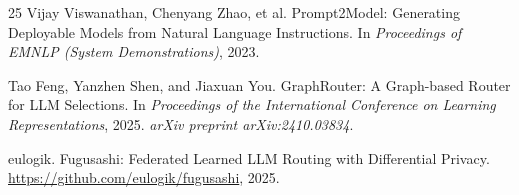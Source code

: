 \documentclass[11pt,a4paper]{article}
\begin{document}
\begin{thebibliography}{25}
Vijay Viswanathan, Chenyang Zhao, et al.
\newblock Prompt2Model: Generating Deployable Models from Natural Language Instructions.
\newblock In \emph{Proceedings of EMNLP (System Demonstrations)}, 2023.

Tao Feng, Yanzhen Shen, and Jiaxuan You.
\newblock GraphRouter: A Graph-based Router for LLM Selections.
\newblock In \emph{Proceedings of the International Conference on Learning Representations}, 2025.
\newblock \emph{arXiv preprint arXiv:2410.03834}.

eulogik.
\newblock Fugusashi: Federated Learned LLM Routing with Differential Privacy.
\newblock \url{https://github.com/eulogik/fugusashi}, 2025.

\end{thebibliography}
\end{document}
